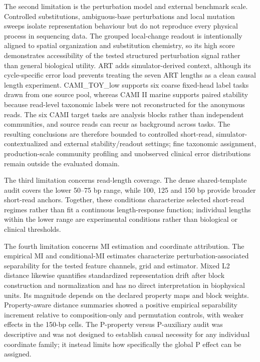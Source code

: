 The second limitation is the perturbation model and external benchmark scale. Controlled substitutions, ambiguous-base perturbations and local mutation sweeps isolate representation behaviour but do not reproduce every physical process in sequencing data. The grouped local-change readout is intentionally aligned to spatial organization and substitution chemistry, so its high score demonstrates accessibility of the tested structured perturbation signal rather than general biological utility. ART adds simulator-derived context, although its cycle-specific error load prevents treating the seven ART lengths as a clean causal length experiment. CAMI\_TOY\_low supports six coarse fixed-head label tasks drawn from one source pool, whereas CAMI II marine supports paired stability because read-level taxonomic labels were not reconstructed for the anonymous reads. The six CAMI target tasks are analysis blocks rather than independent communities, and source reads can recur as background across tasks. The resulting conclusions are therefore bounded to controlled short-read, simulator-contextualized and external stability/readout settings; fine taxonomic assignment, production-scale community profiling and unobserved clinical error distributions remain outside the evaluated domain.

The third limitation concerns read-length coverage. The dense shared-template audit covers the lower 50--75 bp range, while 100, 125 and 150 bp provide broader short-read anchors. Together, these conditions characterize selected short-read regimes rather than fit a continuous length-response function; individual lengths within the lower range are experimental conditions rather than biological or clinical thresholds.

The fourth limitation concerns MI estimation and coordinate attribution. The empirical MI and conditional-MI estimates characterize perturbation-associated separability for the tested feature channels, grid and estimator. Mixed L2 distance likewise quantifies standardized representation drift after block construction and normalization and has no direct interpretation in biophysical units. Its magnitude depends on the declared property maps and block weights. Property-aware distance summaries showed a positive empirical separability increment relative to composition-only and permutation controls, with weaker effects in the 150-bp cells. The P-property versus P-auxiliary audit was descriptive and was not designed to establish causal necessity for any individual coordinate family; it instead limits how specifically the global P effect can be assigned.

